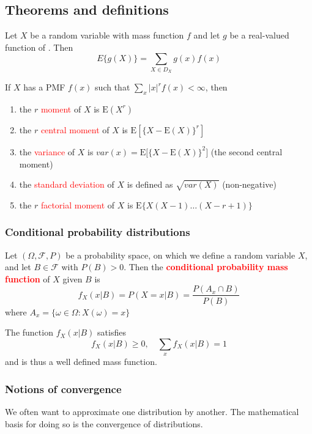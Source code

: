 \documentclass[12pt,a4paper]{article}
\newcommand{\E}{\ensuremath{\mathrm{E}}}
\begin{document}
\subsection{Theorems and definitions}
 Let $X$ be a random variable with mass function $f$ and let $g$ be a real-valued function of \R. Then 
\[E\{g(X)\} = \sum_{X\in D_X} g(x)f(x)\]
\begin{boite}
     If $X$ has a PMF $f(x)$ such that $\sum_x |x|^r f(x) < \infty$, then 
    \begin{enumerate}[label=(\alph*)]
        \item the $r$ \textcolor{red}{moment} of $X$ is $\E(X^r)$
        \item the $r$ \textcolor{red}{central moment} of $X$ is $\E[\{X-\E(X)\}^r]$
        \item the \textcolor{red}{variance} of $X$ is $var(x) = \E\Big[\big\{X-\E(X)\big\}^2\Big]$ (the second central moment)
        \item the \textcolor{red}{standard deviation} of $X$ is defined as $\sqrt{var(X)}$ (non-negative)
        \item the $r$ \textcolor{red}{factorial moment} of $X$ is $\E\big\{X(X-1)\ldots(X-r+1)\big\}$
    \end{enumerate}
\end{boite}

\subsubsection*{Conditional probability distributions}
 Let $(\Omega, \mathcal{F}, P)$ be a probability space, on which we define a random variable $X$, and let $B \in \mathcal{F}$ with $P(B) > 0$. Then the \textbf{\textcolor{red}{conditional probability mass function}} of $X$ given $B$ is
\[f_X(x|B) = P(X=x|B)=\frac{P(A_x\cap B)}{P(B)}\]
where $A_x = \{\omega \in \Omega : X(\omega) = x\}$

 The function $f_X(x|B)$ satisfies 
\[f_X(x|B) \geq 0,\quad \sum_x f_X(x|B) = 1\]
and is thus a well defined mass function.

\subsubsection*{Notions of convergence}
We often want to approximate one distribution by another. The mathematical basis for doing so is the convergence of distributions.
\end{document}

